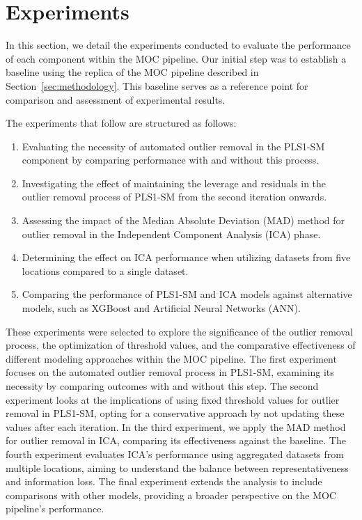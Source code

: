\section{Experiments}\label{sec:experiments}
In this section, we detail the experiments conducted to evaluate the performance of each component within the MOC pipeline.
Our initial step was to establish a baseline using the replica of the MOC pipeline described in Section~\ref{sec:methodology}.
This baseline serves as a reference point for comparison and assessment of experimental results.

The experiments that follow are structured as follows:

\begin{enumerate}
    \item Evaluating the necessity of automated outlier removal in the PLS1-SM component by comparing performance with and without this process.
    \item Investigating the effect of maintaining the leverage and residuals in the outlier removal process of PLS1-SM from the second iteration onwards.
    \item Assessing the impact of the Median Absolute Deviation (MAD) method for outlier removal in the Independent Component Analysis (ICA) phase.
    \item Determining the effect on ICA performance when utilizing datasets from five locations compared to a single dataset.
    \item Comparing the performance of PLS1-SM and ICA models against alternative models, such as XGBoost and Artificial Neural Networks (ANN).
\end{enumerate}

These experiments were selected to explore the significance of the outlier removal process, the optimization of threshold values, and the comparative effectiveness of different modeling approaches within the MOC pipeline.
The first experiment focuses on the automated outlier removal process in PLS1-SM, examining its necessity by comparing outcomes with and without this step.
The second experiment looks at the implications of using fixed threshold values for outlier removal in PLS1-SM, opting for a conservative approach by not updating these values after each iteration.
In the third experiment, we apply the MAD method for outlier removal in ICA, comparing its effectiveness against the baseline.
The fourth experiment evaluates ICA's performance using aggregated datasets from multiple locations, aiming to understand the balance between representativeness and information loss.
The final experiment extends the analysis to include comparisons with other models, providing a broader perspective on the MOC pipeline's performance.

